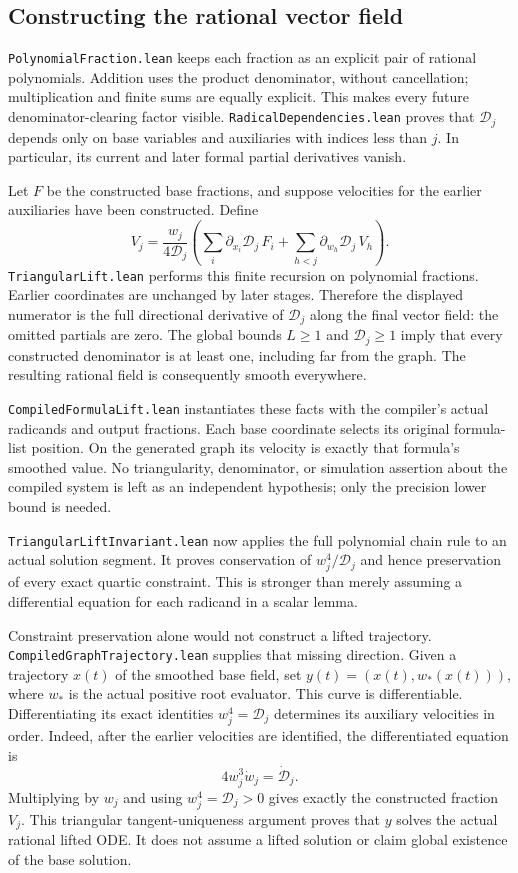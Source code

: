 \documentclass[11pt]{article}
\newcommand{\code}[1]{{\small\nolinkurl{#1}}}
\begin{document}
\subsection{Constructing the rational vector field}

\code{PolynomialFraction.lean} keeps each fraction as an explicit pair
of rational polynomials. Addition uses the product denominator, without
cancellation; multiplication and finite sums are equally explicit.
This makes every future denominator-clearing factor visible.
\code{RadicalDependencies.lean} proves that $\mathcal D_j$ depends only
on base variables and auxiliaries with indices less than $j$. In
particular, its current and later formal partial derivatives vanish.

Let $F$ be the constructed base fractions, and suppose velocities for
the earlier auxiliaries have been constructed. Define
\[
 V_j=\frac{w_j}{4\mathcal D_j}
 \left(\sum_i\partial_{x_i}\mathcal D_j\,F_i
       +\sum_{h<j}\partial_{w_h}\mathcal D_j\,V_h\right).
\]
\code{TriangularLift.lean} performs this finite recursion on polynomial
fractions. Earlier coordinates are unchanged by later stages. Therefore
the displayed numerator is the full directional derivative of
$\mathcal D_j$ along the final vector field: the omitted partials are
zero. The global bounds $L\ge1$ and $\mathcal D_j\ge1$ imply that every
constructed denominator is at least one, including far from the graph.
The resulting rational field is consequently smooth everywhere.

\code{CompiledFormulaLift.lean} instantiates these facts with the
compiler's actual radicands and output fractions. Each base coordinate
selects its original formula-list position. On the generated graph its
velocity is exactly that formula's smoothed value. No triangularity,
denominator, or simulation assertion about the compiled system is left
as an independent hypothesis; only the precision lower bound is needed.

\code{TriangularLiftInvariant.lean} now applies the full polynomial
chain rule to an actual solution segment. It proves conservation of
$w_j^4/\mathcal D_j$ and hence preservation of every exact quartic
constraint. This is stronger than merely assuming a differential
equation for each radicand in a scalar lemma.

Constraint preservation alone would not construct a lifted trajectory.
\code{CompiledGraphTrajectory.lean} supplies that missing direction.
Given a trajectory $x(t)$ of the smoothed base field, set
$y(t)=(x(t),w_*(x(t)))$, where $w_*$ is the actual positive root evaluator.
This curve is differentiable. Differentiating its exact identities
$w_j^4=\mathcal D_j$ determines its auxiliary velocities in order.
Indeed, after the earlier velocities are identified, the differentiated
equation is
\[
 4w_j^3\dot w_j=\dot{\mathcal D}_j.
\]
Multiplying by $w_j$ and using $w_j^4=\mathcal D_j>0$ gives exactly the
constructed fraction $V_j$. This triangular tangent-uniqueness argument
proves that $y$ solves the actual rational lifted ODE. It does not assume
a lifted solution or claim global existence of the base solution.
\end{document}
